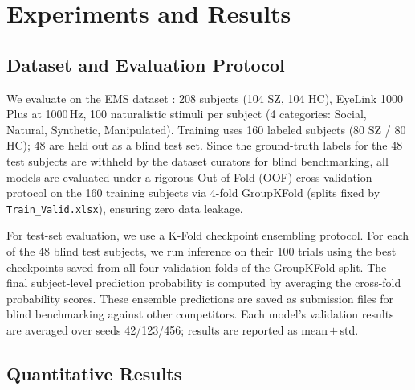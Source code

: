 \section{Experiments and Results}
\label{sec:experiments}

\subsection{Dataset and Evaluation Protocol}
We evaluate on the EMS dataset \cite{song2025}: 208 subjects (104 SZ, 104 HC), EyeLink 1000 Plus at 1000\,Hz, 100 naturalistic stimuli per subject (4 categories: Social, Natural, Synthetic, Manipulated). Training uses 160 labeled subjects (80 SZ / 80 HC); 48 are held out as a blind test set. Since the ground-truth labels for the 48 test subjects are withheld by the dataset curators for blind benchmarking, all models are evaluated under a rigorous Out-of-Fold (OOF) cross-validation protocol on the 160 training subjects via 4-fold GroupKFold (splits fixed by \texttt{Train\_Valid.xlsx}), ensuring zero data leakage. 

For test-set evaluation, we use a K-Fold checkpoint ensembling protocol. For each of the 48 blind test subjects, we run inference on their 100 trials using the best checkpoints saved from all four validation folds of the GroupKFold split. The final subject-level prediction probability is computed by averaging the cross-fold probability scores. These ensemble predictions are saved as submission files for blind benchmarking against other competitors. Each model's validation results are averaged over seeds 42/123/456; results are reported as mean\,$\pm$\,std.

\subsection{Quantitative Results}

